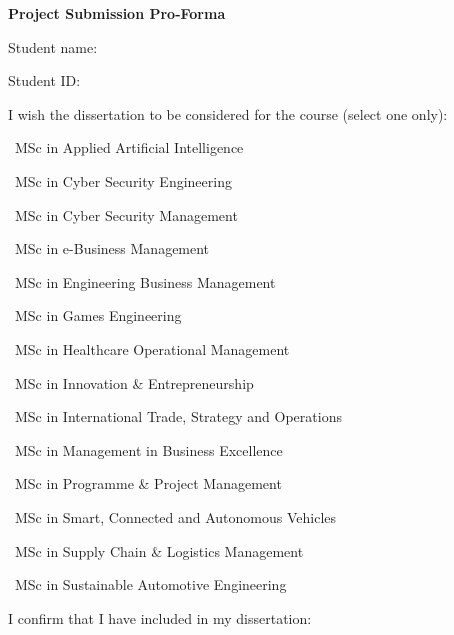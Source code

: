 \thispagestyle{empty}

{\color{black}\LARGE\bfseries Project Submission Pro-Forma\par}
\vspace{4mm}
\vspace{4mm}

\small
\noindent Student name:\quad {}\par
\vspace{2mm}
\noindent Student ID:\qquad {}\par
\vspace{3mm}

\noindent I wish the dissertation to be considered for the course (select one only):

\begin{center}
\begin{minipage}{0.78\textwidth}
\setlength{\parskip}{1pt}
\TickBox\ MSc in Applied Artificial Intelligence\par
\EmptyBox\ MSc in Cyber Security Engineering\par
\EmptyBox\ MSc in Cyber Security Management\par
\EmptyBox\ MSc in e-Business Management\par
\EmptyBox\ MSc in Engineering Business Management\par
\EmptyBox\ MSc in Games Engineering\par
\EmptyBox\ MSc in Healthcare Operational Management\par
\EmptyBox\ MSc in Innovation \& Entrepreneurship\par
\EmptyBox\ MSc in International Trade, Strategy and Operations\par
\EmptyBox\ MSc in Management in Business Excellence\par
\EmptyBox\ MSc in Programme \& Project Management\par
\EmptyBox\ MSc in Smart, Connected and Autonomous Vehicles\par
\EmptyBox\ MSc in Supply Chain \& Logistics Management\par
\EmptyBox\ MSc in Sustainable Automotive Engineering\par
\end{minipage}
\end{center}

\vspace{1mm}
\noindent I confirm that I have included in my dissertation:

